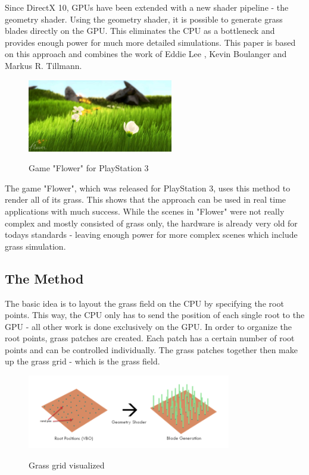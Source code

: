 \documentclass[conference]{acmsiggraph}
\begin{document}
Since DirectX 10, GPUs have been extended with a new shader pipeline - the geometry shader. Using the geometry shader, it is possible to generate grass blades directly on the GPU. This eliminates the CPU as a bottleneck and provides enough power for much more detailed simulations. This paper is based on this approach and combines the work of Eddie Lee \cite{EddieLee}, Kevin Boulanger \cite{KevinBoulanger} and Markus R. Tillmann.  \cite{Tillmann}

 \begin{figure}[ht]
   \centering
   \includegraphics[width=2.5in]{images/flower_game}
   \caption{Game "Flower" for PlayStation 3} \cite{Flower}
 \end{figure}    
 
The game "Flower", which was released for PlayStation 3, uses this method to render all of its grass. This shows that the approach can be used in real time applications with much success. While the scenes in "Flower" were not really complex and mostly consisted of grass only, the hardware is already very old for todays standards - leaving enough power for more complex scenes which include grass simulation.

\subsection{The Method}
The basic idea is to layout the grass field on the CPU by specifying the root points. This way, the CPU only has to send the position of each single root to the GPU - all other work is done exclusively on the GPU. In order to organize the root points, grass patches are created. Each patch has a certain number of root points and can be controlled individually. The grass patches together then 
make up the grass grid - which is the grass field.

 \begin{figure}[ht]
   \centering
   \includegraphics[width=3.5in]{images/grass_grid}
   \caption{Grass grid visualized} \cite{EddieLee}
 \end{figure}
\end{document}
